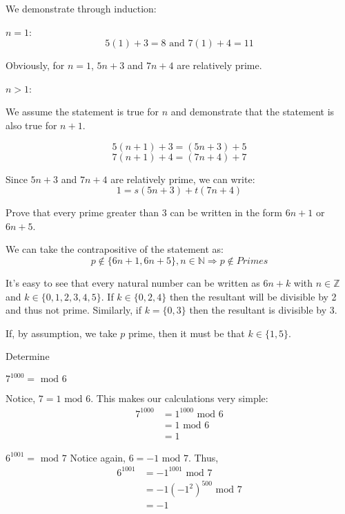 \documentclass[11pt,largemargins]{homework}
\begin{document}
\quad We demonstrate through induction:

\quad $n=1$:
$$5(1)+3=8\text{ and } 7(1)+4=11$$

\quad Obviously, for $n=1$, $5n+3$ and $7n+4$ are relatively prime.

\quad $n>1$:

\quad We assume the statement is true for $n$ and demonstrate that the statement is also true for $n+1$.

$$5(n+1)+3 = (5n+3)+5$$
$$7(n+1)+4 = (7n+4)+7$$

\quad Since $5n+3$ and $7n+4$ are relatively prime, we can write:
$$1 = s(5n+3)+t(7n+4)$$

\question 
Prove that every prime greater than 3 can be written in the form $6n+1$ or $6n+5$.

\quad We can take the contrapositive of the statement as:
$$p \notin \{6n+1, 6n+5\}, n\in\mathbb{N} \Rightarrow p \notin Primes$$

\quad It's easy to see that every natural number can be written as $6n+k$ with $n \in \mathbb{Z}$ and 
$k \in \{0,1,2,3,4,5\}$. If $k\in\{0,2,4\}$ then the resultant will be divisible by 2 and thus not prime.
Similarly, if $k=\{0,3\}$ then the resultant is divisible by 3.

\quad If, by assumption, we take $p$ prime, then it must be that $k\in\{1,5\}$.

\question 
Determine 

\begin{alphaparts}
    \questionpart 
    $7^{1000} = \text{ mod }6$

    \quad Notice, $7=1\text{ mod }6$. This makes our calculations very simple:
    \begin{align*}
        7^{1000} &= 1^{1000}\text{ mod }6\\
                 &= 1 \text{ mod }6\\
                 &= 1
    \end{align*}

    \questionpart 
    $6^{1001} = \text{ mod }7$
    \quad Notice again, $6=-1\text{ mod }7$. Thus,
    \begin{align*}
        6^{1001} &= -1^{1001}\text{ mod }7\\
                 &= -1(-1^2)^{500} \text{ mod }7\\
                 &= -1
    \end{align*}
\end{alphaparts}
\end{document}
